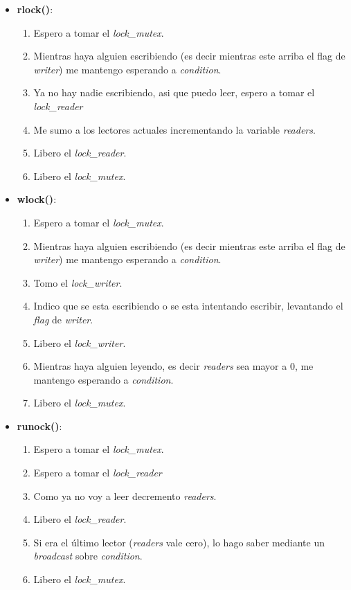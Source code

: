 \begin{itemize}
\item \textbf{rlock()}:
	\begin{enumerate}
	\item Espero a tomar el \textit{lock\_mutex}.
	\item Mientras haya alguien escribiendo (es decir mientras este arriba el flag de 		\textit{writer}) me mantengo esperando a \textit{condition}.
	\item Ya no hay nadie escribiendo, asi que puedo leer, espero a tomar el \textit{lock\_reader}
	\item Me sumo a los lectores actuales incrementando la variable \textit{readers}.
	\item Libero el \textit{lock\_reader}.
	\item Libero el \textit{lock\_mutex}.
	\end{enumerate}
	
\item \textbf{wlock()}:
	\begin{enumerate}
	\item Espero a tomar el \textit{lock\_mutex}.
	\item Mientras haya alguien escribiendo (es decir mientras este arriba el flag de 		\textit{writer}) me mantengo esperando a \textit{condition}.
	\item Tomo el \textit{lock\_writer}.
	\item Indico que se esta escribiendo o se esta intentando escribir, levantando el \textit{flag} de \textit{writer}.
	\item Libero el \textit{lock\_writer}.
	\item Mientras haya alguien leyendo, es decir \textit{readers} sea mayor a 0, me mantengo esperando a \textit{condition}.
	\item Libero el \textit{lock\_mutex}.
	\end{enumerate}
	
\item \textbf{runock()}: 
	\begin{enumerate}
	\item Espero a tomar el \textit{lock\_mutex}.
	\item Espero a tomar el \textit{lock\_reader}
	\item Como ya no voy a leer decremento \textit{readers}.
	\item Libero el \textit{lock\_reader}.
	\item Si era el último lector (\textit{readers} vale cero), lo hago saber mediante un \textit{broadcast} sobre \textit{condition}.
	\item Libero el \textit{lock\_mutex}.
	\end{enumerate}
	

\end{itemize}
